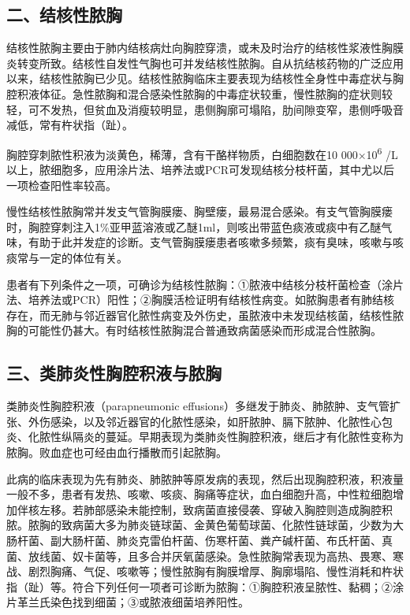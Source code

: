 \subsection{二、结核性脓胸}

结核性脓胸主要由于肺内结核病灶向胸腔穿溃，或未及时治疗的结核性浆液性胸膜炎转变所致。结核性自发性气胸也可并发结核性脓胸。自从抗结核药物的广泛应用以来，结核性脓胸已少见。结核性脓胸临床主要表现为结核性全身性中毒症状与胸腔积液体征。急性脓胸和混合感染性脓胸的中毒症状较重，慢性脓胸的症状则较轻，可不发热，但贫血及消瘦较明显，患侧胸廓可塌陷，肋间隙变窄，患侧呼吸音减低，常有杵状指（趾）。

胸腔穿刺脓性积液为淡黄色，稀薄，含有干酪样物质，白细胞数在10
000×10\textsuperscript{6}
/L以上，脓细胞多，应用涂片法、培养法或PCR可发现结核分枝杆菌，其中尤以后一项检查阳性率较高。

慢性结核性脓胸常并发支气管胸膜瘘、胸壁瘘，最易混合感染。有支气管胸膜瘘时，胸腔穿刺注入1\%亚甲蓝溶液或乙醚1ml，则咳出带蓝色痰液或痰中有乙醚气味，有助于此并发症的诊断。支气管胸膜瘘患者咳嗽多频繁，痰有臭味，咳嗽与咳痰常与一定的体位有关。

患者有下列条件之一项，可确诊为结核性脓胸：①脓液中结核分枝杆菌检查（涂片法、培养法或PCR）阳性；②胸膜活检证明有结核性病变。如脓胸患者有肺结核存在，而无肺与邻近器官化脓性病变及外伤史，虽脓液中未发现结核菌，结核性脓胸的可能性仍甚大。有时结核性脓胸混合普通致病菌感染而形成混合性脓胸。

\subsection{三、类肺炎性胸腔积液与脓胸}

类肺炎性胸腔积液（parapneumonic
effusions）多继发于肺炎、肺脓肿、支气管扩张、外伤感染，以及邻近器官的化脓性感染，如肝脓肿、膈下脓肿、化脓性心包炎、化脓性纵隔炎的蔓延。早期表现为类肺炎性胸腔积液，继后才有化脓性变称为脓胸。败血症也可经由血行播散而引起脓胸。

此病的临床表现为先有肺炎、肺脓肿等原发病的表现，然后出现胸腔积液，积液量一般不多，患者有发热、咳嗽、咳痰、胸痛等症状，血白细胞升高，中性粒细胞增加伴核左移。若肺部感染未能控制，致病菌直接侵袭、穿破入胸腔则造成胸腔积脓。脓胸的致病菌大多为肺炎链球菌、金黄色葡萄球菌、化脓性链球菌，少数为大肠杆菌、副大肠杆菌、肺炎克雷伯杆菌、伤寒杆菌、粪产碱杆菌、布氏杆菌、真菌、放线菌、奴卡菌等，且多合并厌氧菌感染。急性脓胸常表现为高热、畏寒、寒战、剧烈胸痛、气促、咳嗽等；慢性脓胸有胸膜增厚、胸廓塌陷、慢性消耗和杵状指（趾）等。符合下列任何一项者可诊断为脓胸：①胸腔积液呈脓性、黏稠；②涂片革兰氏染色找到细菌；③或脓液细菌培养阳性。

